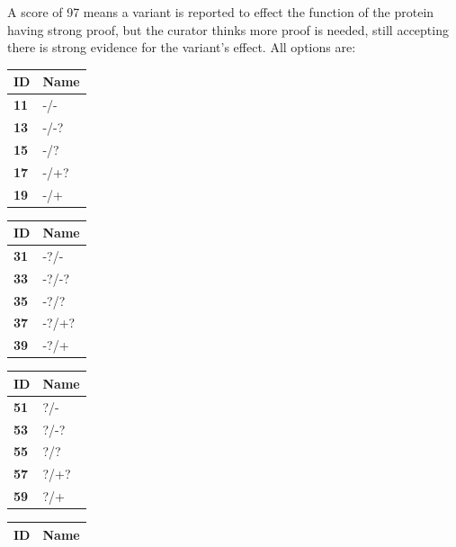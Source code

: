 \documentclass[a4paper,oneside,openany,12pt]{memoir}
\begin{document}
\begin{description}
  A score of 97 means a variant is reported to effect the function of the protein having strong proof, but the curator
   thinks more proof is needed, still accepting there is strong evidence for the variant's effect.
  All options are:\\

  \begin{minipage}[t]{3.15cm}
    \begin{tabular}{>{\bfseries}p{0.6cm} p{1.4cm}}
      ID & \textbf{Name}\\ \hline \hline
      11 & -/-\\ \hline
      13 & -/-?\\ \hline
      15 & -/?\\ \hline
      17 & -/+?\\ \hline
      19 & -/+\\ \hline
    \end{tabular}
  \end{minipage}
  \begin{minipage}[t]{3.15cm}
    \begin{tabular}{>{\bfseries}p{0.6cm} p{1.4cm}}
      ID & \textbf{Name}\\ \hline \hline
      31 & -?/-\\ \hline
      33 & -?/-?\\ \hline
      35 & -?/?\\ \hline
      37 & -?/+?\\ \hline
      39 & -?/+\\ \hline
    \end{tabular}
  \end{minipage}
  \begin{minipage}[t]{3.15cm}
    \begin{tabular}{>{\bfseries}p{0.6cm} p{1.4cm}}
      ID & \textbf{Name}\\ \hline \hline
      51 & ?/-\\ \hline
      53 & ?/-?\\ \hline
      55 & ?/?\\ \hline
      57 & ?/+?\\ \hline
      59 & ?/+\\ \hline
    \end{tabular}
  \end{minipage}
  \begin{minipage}[t]{3.15cm}
    \begin{tabular}{>{\bfseries}p{0.6cm} p{1.4cm}}
      ID & \textbf{Name}\\ \hline \hline

\end{tabular}
\end{minipage}
\end{description}
\end{document}
